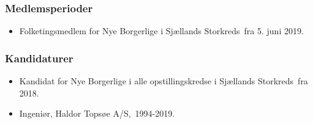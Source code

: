\documentclass[11pt, a4paper]{awesome-cv}
\begin{document}
\begin{cvletter}
\subsubsection*{Medlemsperioder}
\begin{itemize}
\item Folketingsmedlem for Nye Borgerlige i Sjællands Storkreds fra 5. juni 2019.
\end{itemize}
\subsubsection*{Kandidaturer}
\begin{itemize}
\item Kandidat for Nye Borgerlige i alle opstillingskredse i Sjællands Storkreds fra 2018.
\end{itemize}
\begin{itemize}
\item Ingeniør, Haldor Topsøe A/S, 1994-2019.
\end{itemize}
\end{cvletter}
\end{document}
